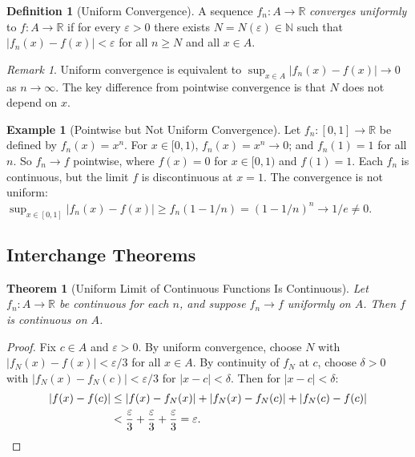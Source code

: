 \documentclass[11pt,a4paper]{article}
\theoremstyle{definition}
\newtheorem{definition}{Definition}[section]
\newtheorem{example}{Example}[section]
\theoremstyle{plain}
\newtheorem{theorem}{Theorem}[section]
\theoremstyle{remark}
\newtheorem{remark}{Remark}[section]
\newcommand{\R}{\mathbb{R}}
\newcommand{\N}{\mathbb{N}}
\begin{document}
\begin{definition}[Uniform Convergence]
\label{def:uniform}
A sequence $f_n : A \to \R$ \emph{converges uniformly} to $f : A \to \R$ if
for every $\varepsilon > 0$ there exists $N = N(\varepsilon) \in \N$ such that
$|f_n(x) - f(x)| < \varepsilon$ for all $n \ge N$ and all $x \in A$.
\end{definition}

\begin{remark}
\label{rem:uniform_sup}
Uniform convergence is equivalent to
$\sup_{x \in A} |f_n(x) - f(x)| \to 0$
as $n \to \infty$. The key difference from pointwise convergence is that $N$
does not depend on $x$.
\end{remark}

\begin{example}[Pointwise but Not Uniform Convergence]
\label{ex:pointwise_not_uniform}
Let $f_n : [0, 1] \to \R$ be defined by $f_n(x) = x^n$. For $x \in [0, 1)$,
$f_n(x) = x^n \to 0$; and $f_n(1) = 1$ for all $n$. So $f_n \to f$ pointwise,
where $f(x) = 0$ for $x \in [0, 1)$ and $f(1) = 1$. Each $f_n$ is continuous, but
the limit $f$ is discontinuous at $x = 1$. The convergence is not uniform:
$\sup_{x \in [0,1]} |f_n(x) - f(x)| \ge f_n(1 - 1/n) = (1 - 1/n)^n \to 1/e
\neq 0$.
\end{example}

\subsection{Interchange Theorems}
\label{subsec:interchange}

\begin{theorem}[Uniform Limit of Continuous Functions Is Continuous]
\label{thm:uniform_limit_cont}
Let $f_n : A \to \R$ be continuous for each $n$, and suppose $f_n \to f$
uniformly on $A$. Then $f$ is continuous on $A$.
\end{theorem}

\begin{proof}
Fix $c \in A$ and $\varepsilon > 0$. By uniform convergence, choose $N$ with
$|f_N(x) - f(x)| < \varepsilon/3$ for all $x \in A$. By continuity of $f_N$
at $c$, choose $\delta > 0$ with $|f_N(x) - f_N(c)| < \varepsilon/3$ for
$|x - c| < \delta$. Then for $|x - c| < \delta$:
\begin{align*}
|f(x) - f(c)|
&\le |f(x) - f_N(x)| + |f_N(x) - f_N(c)| + |f_N(c) - f(c)| \\
&< \frac{\varepsilon}{3} + \frac{\varepsilon}{3} + \frac{\varepsilon}{3}
= \varepsilon. \qedhere
\end{align*}
\end{proof}
\end{document}
